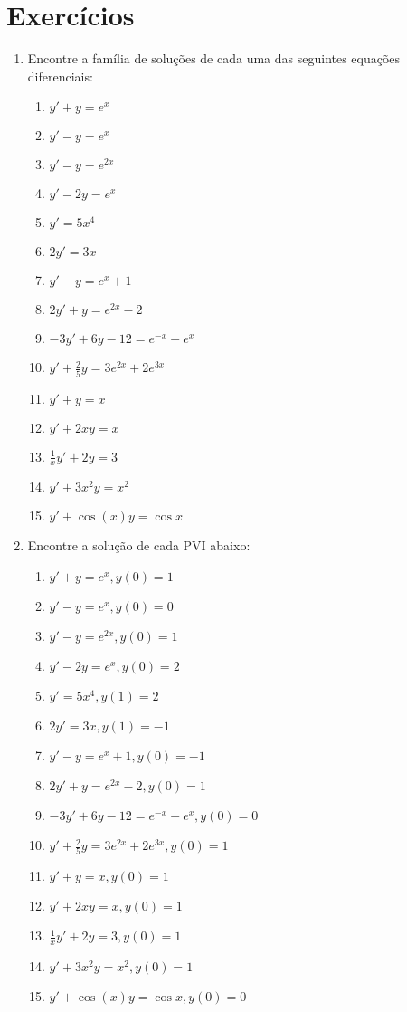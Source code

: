 \documentclass[a4paper]{article}
\begin{document}
\section{Exercícios}
\begin{enumerate}
\item Encontre a família de soluções de cada uma das seguintes
  equações diferenciais:

  \begin{enumerate}
  \item $y' +y = e^x$
  \item $y' -y = e^x$
  \item $y' -y = e^{2x}$
  \item $y' -2y = e^x$
  \item $y' = 5x^4$
  \item $2y' = 3x$
  \item $y' -y = e^x + 1$
  \item $2y' +y =e^{2x} - 2$
  \item $-3y' + 6y -12 = e^{-x} + e^x$
  \item $y' + \frac{2}{5}y = 3e^{2x} + 2e^{3x}$
  \item $y' + y = x$
  \item $y' + 2xy = x$
  \item $\frac{1}{x}y' + 2y = 3$
  \item $y' +3x^2y = x^2$
  \item $y' + \cos (x) y = \cos x$
  \end{enumerate}

\newpage
\item Encontre a solução de cada PVI abaixo:

  \begin{enumerate}
  \item $y' +y = e^x, y(0)=1$
  \item $y' -y = e^x,y(0)=0$
  \item $y' -y = e^{2x}, y(0)=1$
  \item $y' -2y = e^x, y(0)=2$
  \item $y' = 5x^4, y(1)=2$
  \item $2y' = 3x, y(1)=-1$
  \item $y' -y = e^x + 1, y(0)=-1$
  \item $2y' +y =e^{2x} - 2, y(0)=1$
  \item $-3y' + 6y -12 = e^{-x} + e^x, y(0)=0$
  \item $y' + \frac{2}{5}y = 3e^{2x} + 2e^{3x}, y(0)=1$
  \item $y' + y = x, y(0)=1$
  \item $y' + 2xy = x, y(0)=1$
  \item $\frac{1}{x}y' + 2y = 3, y(0)=1$
  \item $y' +3x^2y = x^2, y(0)=1$
  \item $y' + \cos (x) y = \cos x, y(0)=0$
  \end{enumerate}

\end{enumerate}
\end{document}
